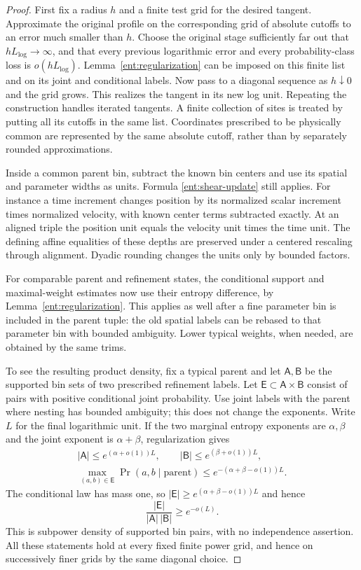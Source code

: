 \begin{proof}
First fix a radius $h$ and a finite test grid for the desired
tangent.  Approximate the original profile on the corresponding
grid of absolute cutoffs to an error much smaller than $h$.
Choose the original stage sufficiently far out that
$hL_{\log}\to\infty$, and that every previous logarithmic error
and every probability-class loss is $o(hL_{\log})$.
Lemma~\ref{ent:regularization} can be imposed on this finite list
and on its joint and conditional labels.  Now pass to a diagonal
sequence as $h\downarrow0$ and the grid grows.  This realizes the
tangent in its new log unit.  Repeating the construction handles
iterated tangents.  A finite collection of sites is treated by
putting all its cutoffs in the same list.  Coordinates prescribed
to be physically common are represented by the same absolute
cutoff, rather than by separately rounded approximations.

Inside a common parent bin, subtract the known bin centers and use
its spatial and parameter widths as units.  Formula
\eqref{ent:shear-update} still applies.  For instance a time
increment changes position by its normalized scalar increment
times normalized velocity, with known center terms subtracted
exactly.  At an aligned triple the position unit equals the
velocity unit times the time unit.  The defining affine equalities
of these depths are preserved under a centered rescaling through
alignment.  Dyadic rounding changes the units only by bounded
factors.

For comparable parent and refinement states, the conditional
support and maximal-weight estimates now use their entropy
difference, by Lemma~\ref{ent:regularization}.  This applies as
well after a fine parameter bin is included in the parent tuple:
the old spatial labels can be rebased to that parameter bin with
bounded ambiguity.  Lower typical weights, when needed, are
obtained by the same trims.

To see the resulting product density, fix a typical parent and
let $\mathsf A,\mathsf B$ be the supported bin sets of two
prescribed refinement labels.  Let $\mathsf E\subset
\mathsf A\times\mathsf B$ consist of pairs with positive
conditional joint probability.  Use joint labels with the parent
where nesting has bounded ambiguity; this does not change the
exponents.  Write $L$ for the final logarithmic unit.  If the
two marginal entropy exponents are $\alpha,\beta$ and the joint
exponent is $\alpha+\beta$, regularization gives
\begin{gather*}
|\mathsf A|\leq e^{(\alpha+o(1))L},\qquad
|\mathsf B|\leq e^{(\beta+o(1))L},\\
\max_{(a,b)\in\mathsf E}\Pr(a,b\mid\text{parent})
\leq e^{-(\alpha+\beta-o(1))L}.
\end{gather*}
The conditional law has mass one, so
$|\mathsf E|\geq e^{(\alpha+\beta-o(1))L}$ and hence
\[
\frac{|\mathsf E|}{|\mathsf A|\,|\mathsf B|}
\geq e^{-o(L)}.
\]
This is subpower density of supported bin pairs, with no
independence assertion.  All these statements hold at every
fixed finite power grid, and hence on successively finer grids
by the same diagonal choice.
\end{proof}

